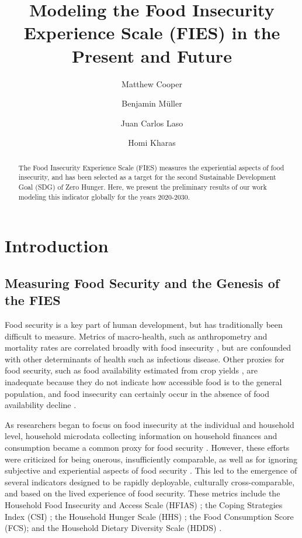 \documentclass{article}
\begin{document}
\title{Modeling the Food Insecurity Experience Scale (FIES) in the Present and Future}

\author[1]{Matthew Cooper}
\author[2]{Benjamin Müller}
\author[3]{Juan Carlos Laso}
\author[4]{Homi Kharas}


\maketitle
\begin{abstract}
The Food Insecurity Experience Scale (FIES) measures the experiential aspects of food insecurity, and has been selected as a target for the second Sustainable Development Goal (SDG) of Zero Hunger.  Here, we present the preliminary results of our work modeling this indicator globally for the years 2020-2030.

\end{abstract}

\section{Introduction}

\subsection{Measuring Food Security and the Genesis of the FIES}
Food security is a key part of human development, but has traditionally been difficult to measure.  Metrics of macro-health, such as anthropometry and mortality rates are correlated broadly with food insecurity \cite{Puffer1973, Habicht1974}, but are confounded with other determinants of health such as infectious disease.  Other proxies for food security, such as food availability estimated from crop yields \cite{Maxwell1992}, are inadequate because they do not indicate how accessible food is to the general population, and food insecurity can certainly occur in the absence of food availability decline \cite{Sen1983}.

As researchers began to focus on food insecurity at the individual and household level, household microdata collecting information on household finances and consumption became a common proxy for food security \cite{Haddad1994}.  However, these efforts were criticized for being onerous, insufficiently comparable, as well as for ignoring subjective and experiential aspects of food security \cite{Maxwell1996}.  This led to the emergence of several indicators designed to be rapidly deployable, culturally cross-comparable, and based on the lived experience of food security.  These metrics include the Household Food Insecurity and Access Scale (HFIAS) \cite{Coates2007}; the Coping Strategies Index (CSI) \cite{Maxwell1999}; the Household Hunger Scale (HHS) \cite{Ballard2011}; the Food Consumption Score (FCS); and the Household Dietary Diversity Scale (HDDS) \cite{Kennedy2010}.
\end{document}
